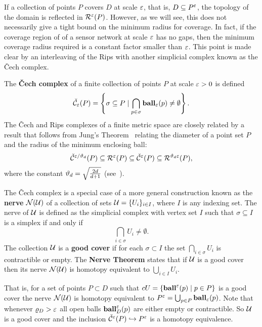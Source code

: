If a collection of points $P$ covers $D$ at scale $\varepsilon$, that is, $D\subseteq P^\varepsilon$, the topology of the domain is reflected in $\mathcal{R}^\varepsilon(P)$.
However, as we will see, this does not necessarily give a tight bound on the minimum radius for coverage.
In fact, if the coverage region of of a sensor network at scale $\varepsilon$ has no gaps, then the minimum coverage radius required is a constant factor smaller than $\varepsilon$.
This point is made clear by an interleaving of the Rips with another simplicial complex known as the \v Cech complex.

The \textbf{\v Cech complex} of a finite collection of points $P$ at scale $\varepsilon > 0$ is defined
  \[ \check{\mathcal{C}}_\varepsilon(P) = \left\{\sigma \subseteq P\mid \bigcap_{p\in \sigma}\mathbf{ball}_\varepsilon(p)\neq \emptyset \right\}. \]
The \v Cech and Rips complexes of a finite metric space are closely related by a result that follows from Jung's Theorem~\cite{jung01uber} relating the diameter of a point set $P$ and the radius of the minimum enclosing ball:
\[\check{\mathcal{C}}^{\varepsilon/\vartheta_d}(P)\subseteq\mathcal{R}^\varepsilon(P)\subseteq\check{\mathcal{C}}^\varepsilon(P)\subseteq\mathcal{R}^{\vartheta_d\varepsilon}(P),\]
where the constant $\vartheta_d = \sqrt{\frac{2d}{d+1}}$ (see~\cite{buchet15efficient}).

The \v Cech complex is a special case of a more general construction known as the \textbf{nerve} $\mathcal{N}(\mathcal{U})$ of a collection of sets $\mathcal{U} = \{U_i\}_{i\in I}$, where $I$ is any indexing set.
The nerve of $\mathcal{U}$ is defined as the simplicial complex with vertex set $I$ such that $\sigma\subseteq I$ is a simplex if and only if
\[
  \bigcap_{i\in \sigma} U_i\neq \emptyset.
\]
The collection $\mathcal{U}$ is a \textbf{good cover} if for each $\sigma\subset I$ the set $\bigcap_{i\in\sigma} U_i$ is contractible or empty.
The \textbf{Nerve Theorem} states that if $\mathcal{U}$ is a good cover then its nerve $\mathcal{N}(\mathcal{U})$ is homotopy equivalent to $\bigcup_{i\in I} U_i$.

That is, for a set of points $P\subset D$ such that $cU = \{\mathbf{ball}^\varepsilon(p)\mid p\in P\}$ is a good cover the nerve $\mathcal{N}(\mathcal{U})$ is homotopy equivalent to $P^\varepsilon = \bigcup_{p\in P} \mathbf{ball}_\varepsilon(p)$.
Note that whenever $\varrho_D > \varepsilon$ all open balls $\mathbf{ball}^\varepsilon_D(p)$ are either empty or contractible.
So $\mathcal{U}$ is a good cover and the inclusion $\check{\mathcal{C}}^\varepsilon(P)\hookrightarrow P^\varepsilon$ is a homotopy equivalence.
